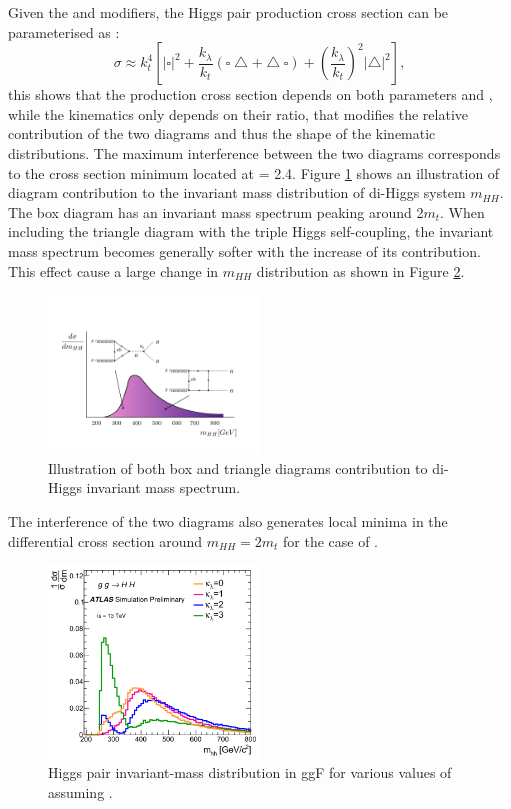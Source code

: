 Given the \kt and \kl modifiers, the Higgs pair production cross section can be parameterised as :
\begin{equation}
  \sigma \approx k_{t}^{4}\left[|\square|^{2}+\frac{k_{\lambda}}{k_{t}}(\square\bigtriangleup+\bigtriangleup \square)+\left(\frac{k_{\lambda}}{k_{t}}\right)^{2}|\bigtriangleup|^{2}\right], 
\end{equation}
this shows that the production cross section depends on both parameters \kt and \kl, while the kinematics only depends on their ratio, that modifies the relative contribution of the two diagrams and thus the shape of the kinematic distributions. The maximum interference between the two diagrams corresponds to the cross section minimum located at \kl = 2.4\kt. Figure \ref{fig:chap1:HH:BSM:I} shows an illustration of diagram contribution to the invariant mass distribution of di-Higgs system $m_{HH}$. The box diagram has an invariant mass spectrum peaking around 2$m_t$. When including the triangle diagram with the triple Higgs self-coupling, the invariant mass spectrum becomes generally softer with the increase of its contribution. This effect cause a large change in $m_{HH}$ distribution as shown in Figure \ref{fig:chap1:HH:BSM:MHH}.
\begin{figure}[H]
    \centering
    \includegraphics[width=0.5\textwidth]{Ch1/Img/illustration_mHH.jpeg}
    \caption{Illustration of both box and triangle diagrams contribution to di-Higgs invariant mass spectrum.}
    \label{fig:chap1:HH:BSM:I}
\end{figure}
The interference of the two diagrams also generates local minima in the differential cross section around $m_{HH}=2m_t$ for the case of .
\begin{figure}[H]
    \centering
    \includegraphics[width=0.5\textwidth]{Ch1/Img/mHH.png}
    \caption{Higgs pair invariant-mass distribution in ggF for various values of \kl assuming .}
    \label{fig:chap1:HH:BSM:MHH}
\end{figure}

